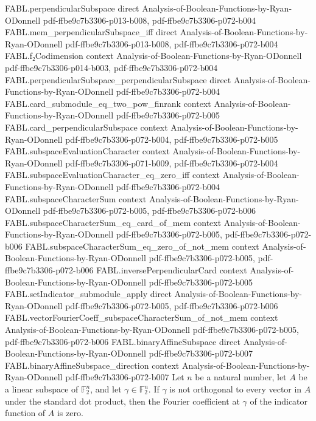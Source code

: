 \begin{theorem}
  {FABL.perpendicularSubspace}
  {direct}
  {Analysis-of-Boolean-Functions-by-Ryan-ODonnell}
  {pdf-ffbe9c7b3306-p013-b008,
    pdf-ffbe9c7b3306-p072-b004}
\proofstep
  {FABL.mem_perpendicularSubspace_iff}
  {direct}
  {Analysis-of-Boolean-Functions-by-Ryan-ODonnell}
  {pdf-ffbe9c7b3306-p013-b008,
    pdf-ffbe9c7b3306-p072-b004}
\proofstep
  {FABL.f₂Codimension}
  {context}
  {Analysis-of-Boolean-Functions-by-Ryan-ODonnell}
  {pdf-ffbe9c7b3306-p014-b003,
    pdf-ffbe9c7b3306-p072-b004}
\proofstep
  {FABL.perpendicularSubspace_perpendicularSubspace}
  {direct}
  {Analysis-of-Boolean-Functions-by-Ryan-ODonnell}
  {pdf-ffbe9c7b3306-p072-b004}
\proofstep
  {FABL.card_submodule_eq_two_pow_finrank}
  {context}
  {Analysis-of-Boolean-Functions-by-Ryan-ODonnell}
  {pdf-ffbe9c7b3306-p072-b005}
\proofstep
  {FABL.card_perpendicularSubspace}
  {context}
  {Analysis-of-Boolean-Functions-by-Ryan-ODonnell}
  {pdf-ffbe9c7b3306-p072-b004,
    pdf-ffbe9c7b3306-p072-b005}
\proofstep
  {FABL.subspaceEvaluationCharacter}
  {context}
  {Analysis-of-Boolean-Functions-by-Ryan-ODonnell}
  {pdf-ffbe9c7b3306-p071-b009,
    pdf-ffbe9c7b3306-p072-b004}
\proofstep
  {FABL.subspaceEvaluationCharacter_eq_zero_iff}
  {context}
  {Analysis-of-Boolean-Functions-by-Ryan-ODonnell}
  {pdf-ffbe9c7b3306-p072-b004}
\proofstep
  {FABL.subspaceCharacterSum}
  {context}
  {Analysis-of-Boolean-Functions-by-Ryan-ODonnell}
  {pdf-ffbe9c7b3306-p072-b005,
    pdf-ffbe9c7b3306-p072-b006}
\proofstep
  {FABL.subspaceCharacterSum_eq_card_of_mem}
  {context}
  {Analysis-of-Boolean-Functions-by-Ryan-ODonnell}
  {pdf-ffbe9c7b3306-p072-b005,
    pdf-ffbe9c7b3306-p072-b006}
\proofstep
  {FABL.subspaceCharacterSum_eq_zero_of_not_mem}
  {context}
  {Analysis-of-Boolean-Functions-by-Ryan-ODonnell}
  {pdf-ffbe9c7b3306-p072-b005,
    pdf-ffbe9c7b3306-p072-b006}
\proofstep
  {FABL.inversePerpendicularCard}
  {context}
  {Analysis-of-Boolean-Functions-by-Ryan-ODonnell}
  {pdf-ffbe9c7b3306-p072-b005}
\proofstep
  {FABL.setIndicator_submodule_apply}
  {direct}
  {Analysis-of-Boolean-Functions-by-Ryan-ODonnell}
  {pdf-ffbe9c7b3306-p072-b005,
    pdf-ffbe9c7b3306-p072-b006}
\proofstep
  {FABL.vectorFourierCoeff_subspaceCharacterSum_of_not_mem}
  {context}
  {Analysis-of-Boolean-Functions-by-Ryan-ODonnell}
  {pdf-ffbe9c7b3306-p072-b005,
    pdf-ffbe9c7b3306-p072-b006}
\proofstep
  {FABL.binaryAffineSubspace}
  {direct}
  {Analysis-of-Boolean-Functions-by-Ryan-ODonnell}
  {pdf-ffbe9c7b3306-p072-b007}
\proofstep
  {FABL.binaryAffineSubspace_direction}
  {context}
  {Analysis-of-Boolean-Functions-by-Ryan-ODonnell}
  {pdf-ffbe9c7b3306-p072-b007}
Let $n$ be a natural number, let $A$ be a linear subspace of $\mathbb{F}_2^n$, and let
$\gamma\in\mathbb{F}_2^n$. If $\gamma$ is not orthogonal to every vector in $A$ under
the standard dot product, then the Fourier coefficient at $\gamma$ of the indicator
function of $A$ is zero.
\end{theorem}

